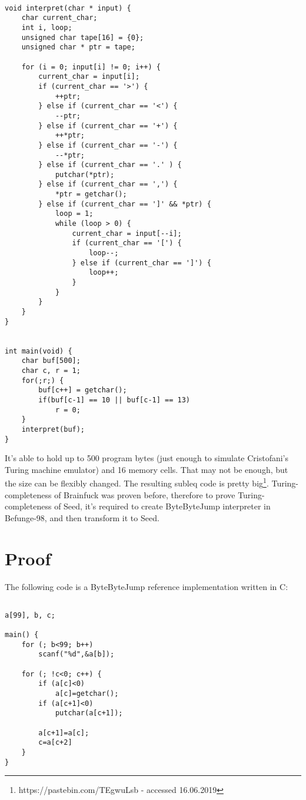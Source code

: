 \documentclass{article}
\begin{document}
\begin{verbatim}

void interpret(char * input) {
    char current_char;
    int i, loop;
    unsigned char tape[16] = {0};
    unsigned char * ptr = tape;

    for (i = 0; input[i] != 0; i++) {
        current_char = input[i];
        if (current_char == '>') {
            ++ptr;
        } else if (current_char == '<') {
            --ptr;
        } else if (current_char == '+') {
            ++*ptr;
        } else if (current_char == '-') {
            --*ptr;
        } else if (current_char == '.' ) {
            putchar(*ptr);
        } else if (current_char == ',') {
            *ptr = getchar();
        } else if (current_char == ']' && *ptr) {
            loop = 1;
            while (loop > 0) {
                current_char = input[--i];
                if (current_char == '[') {
                    loop--;
                } else if (current_char == ']') {
                    loop++;
                }
            }
        }
    }
}


int main(void) {
    char buf[500];
    char c, r = 1;
    for(;r;) {
        buf[c++] = getchar();
        if(buf[c-1] == 10 || buf[c-1] == 13)
            r = 0;
    }
    interpret(buf);
}

\end{verbatim}

\par It's able to hold up to 500 program bytes (just enough to simulate Cristofani's Turing machine emulator) and 16 memory cells. That may not be enough, but the size can be flexibly changed. The resulting subleq code is pretty big\footnote{https://pastebin.com/TEgwuLsb - accessed 16.06.2019}. Turing-completeness of Brainfuck was proven before, therefore to prove Turing-completeness of Seed, it's required to create ByteByteJump interpreter in Befunge-98, and then transform it to Seed.

\section{Proof}

\par The following code is a ByteByteJump reference implementation written in C:

\begin{verbatim}

a[99], b, c;

main() {
    for (; b<99; b++)
        scanf("%d",&a[b]);
    
    for (; !c<0; c++) {
        if (a[c]<0)
            a[c]=getchar(); 
        if (a[c+1]<0)
            putchar(a[c+1]);
        
        a[c+1]=a[c];
        c=a[c+2]
    }
}

\end{verbatim}
\end{document}
